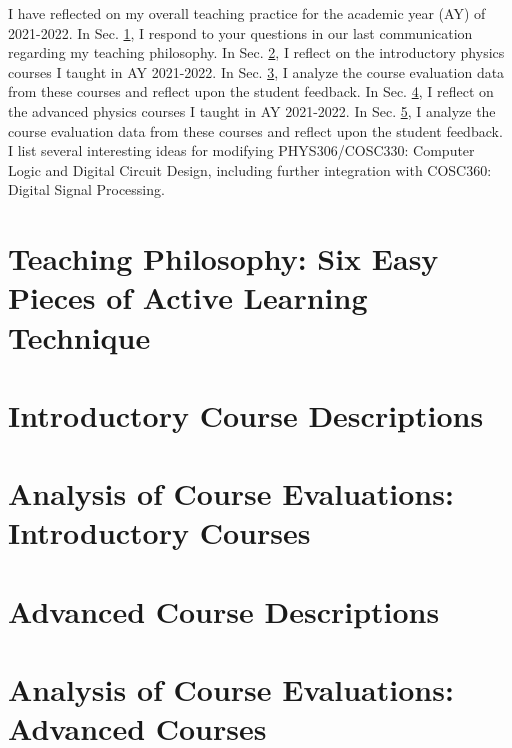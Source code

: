 \documentclass[../../main.tex]{subfiles}
\begin{document}
\label{sec:teaching}

I have reflected on my overall teaching practice for the academic year (AY) of 2021-2022.  In Sec. \ref{sec:teaching_philosophy}, I respond to your questions in our last communication regarding my teaching philosophy.  In Sec. \ref{sec:intro}, I reflect on the introductory physics courses I taught in AY 2021-2022.  In Sec. \ref{sec:intro_eval}, I analyze the course evaluation data from these courses and reflect upon the student feedback.  In Sec. \ref{sec:adv}, I reflect on the advanced physics courses I taught in AY 2021-2022.  In Sec. \ref{sec:adv_eval}, I analyze the course evaluation data from these courses and reflect upon the student feedback.  I list several interesting ideas for modifying PHYS306/COSC330: Computer Logic and Digital Circuit Design, including further integration with COSC360: Digital Signal Processing.

\section{Teaching Philosophy: Six Easy Pieces of Active Learning Technique}
\label{sec:teaching_philosophy}

\begin{flushleft}

\end{flushleft}

\section{Introductory Course Descriptions}
\label{sec:intro}

\begin{flushleft}

\end{flushleft}

\section{Analysis of Course Evaluations: Introductory Courses}
\label{sec:intro_eval}

\begin{flushleft}

\end{flushleft}

\section{Advanced Course Descriptions}
\label{sec:adv}

\begin{flushleft}

\end{flushleft}

\section{Analysis of Course Evaluations: Advanced Courses}
\label{sec:adv_eval}

\begin{flushleft}

\end{flushleft}
\end{document}
